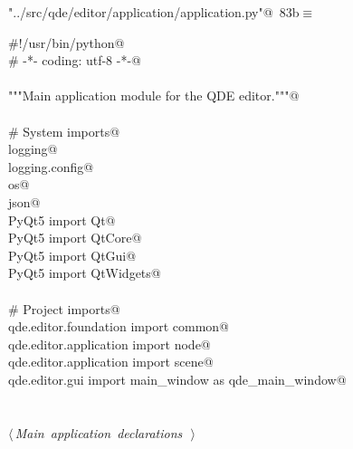 \documentclass[
    a4paper,      %
    10pt,         %
    openright,    %
    notitlepage,  %
    parskip=half, %
]{scrreprt}       %
\theoremstyle{definition}                    %
\begin{document}
\begin{flushleft} \small
\begin{minipage}{\linewidth}\label{scrap134}\raggedright\small
{} \verb@"../src/qde/editor/application/application.py"@\nobreak\ {\footnotesize {83b}}$\equiv$
\vspace{-1ex}
\begin{list}{}{} \item
\mbox{}\lstinline@#!/usr/bin/python@\\
\mbox{}\lstinline@# -*- coding: utf-8 -*-@\\
\mbox{}\lstinline@@\\
\mbox{}\lstinline@"""Main application module for the QDE editor."""@\\
\mbox{}\lstinline@@\\
\mbox{}\lstinline@# System imports@\\
\mbox{}\lstinline@import logging@\\
\mbox{}\lstinline@import logging.config@\\
\mbox{}\lstinline@import os@\\
\mbox{}\lstinline@import json@\\
\mbox{}\lstinline@from PyQt5 import Qt@\\
\mbox{}\lstinline@from PyQt5 import QtCore@\\
\mbox{}\lstinline@from PyQt5 import QtGui@\\
\mbox{}\lstinline@from PyQt5 import QtWidgets@\\
\mbox{}\lstinline@@\\
\mbox{}\lstinline@# Project imports@\\
\mbox{}\lstinline@from qde.editor.foundation import common@\\
\mbox{}\lstinline@from qde.editor.application import node@\\
\mbox{}\lstinline@from qde.editor.application import scene@\\
\mbox{}\lstinline@from qde.editor.gui import main_window as qde_main_window@\\
\mbox{}\lstinline@@\\
\mbox{}\lstinline@@\\
\mbox{}\lstinline@@\hbox{$\langle\,${\itshape Main application declarations}\nobreak\ {\footnotesize {}}$\,\rangle$}\lstinline@@\\
\mbox{}\lstinline@@{\NWsep}
\end{list}
\vspace{-1.5ex}
\footnotesize
\begin{list}{}{\setlength{\itemsep}{-\parsep}\setlength{\itemindent}{-\leftmargin}}

\item{}
\end{list}
\end{minipage}\vspace{4ex}
\end{flushleft}
\end{document}
